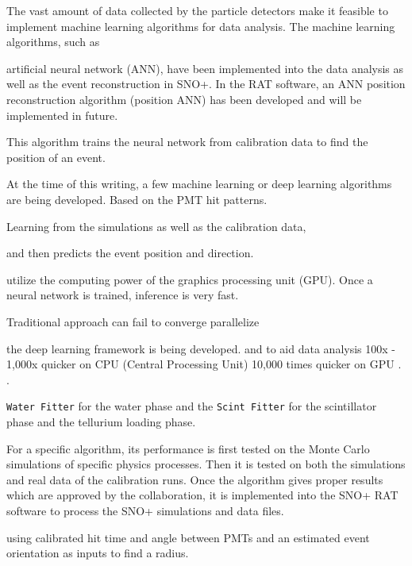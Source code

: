 The vast amount of data collected by the particle detectors make it feasible to implement machine learning algorithms for data analysis.
The machine learning algorithms, such as 

artificial neural network (ANN), have been implemented into the data analysis as well as the event reconstruction in SNO+. In the RAT software, an ANN position reconstruction algorithm (position ANN) has been developed and will be implemented in future. 

This algorithm trains the neural network from calibration data to find the position of an event.
                                                                                                                                                                                                                                                                   
At the time of this writing, a few machine learning or deep learning algorithms are being developed. Based on the PMT hit patterns.

 Learning from the simulations as well as the calibration data, 

and then predicts the event position and direction.

utilize the computing power of the graphics processing unit (GPU). 
Once a neural network is trained, 
inference is very fast.

 Traditional approach can fail to converge
parallelize

the deep learning framework is being developed.
and to aid data analysis
100x - 1,000x quicker on CPU (Central Processing Unit)
10,000 times quicker on GPU .
\cite{markNeuralNetwork,markNeuralTalk}.






\texttt{Water Fitter} for the water phase and the \texttt{Scint Fitter} for the scintillator phase and the tellurium loading phase.

For a specific algorithm, its performance is first tested on the Monte Carlo simulations of specific physics processes. Then it is tested on both the simulations and real data of the calibration runs. Once the algorithm gives proper results which are approved by the collaboration, it is implemented into the SNO+ RAT software to process the SNO+ simulations and data files.





using calibrated hit time and angle between PMTs and an estimated event orientation as inputs to find
a radius.


